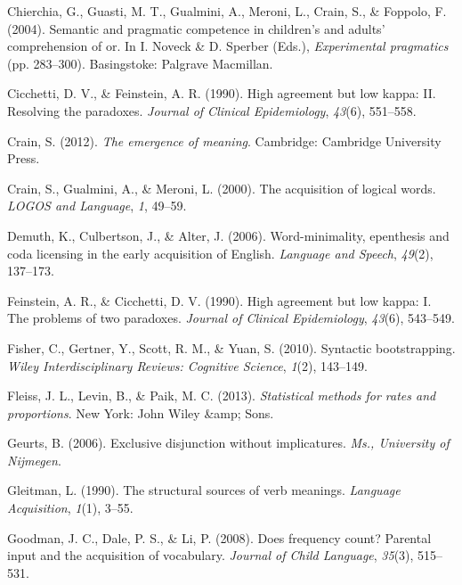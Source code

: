 \documentclass[,man,floatsintext]{apa6}
\begin{document}
\leavevmode\hypertarget{ref-chierchia2004semantic}{}%
Chierchia, G., Guasti, M. T., Gualmini, A., Meroni, L., Crain, S., \& Foppolo, F. (2004). Semantic and pragmatic competence in children's and adults' comprehension of or. In I. Noveck \& D. Sperber (Eds.), \emph{Experimental pragmatics} (pp. 283--300). Basingstoke: Palgrave Macmillan.

\leavevmode\hypertarget{ref-cicchetti1990high}{}%
Cicchetti, D. V., \& Feinstein, A. R. (1990). High agreement but low kappa: II. Resolving the paradoxes. \emph{Journal of Clinical Epidemiology}, \emph{43}(6), 551--558.

\leavevmode\hypertarget{ref-crain2012emergence}{}%
Crain, S. (2012). \emph{The emergence of meaning}. Cambridge: Cambridge University Press.

\leavevmode\hypertarget{ref-crain2000acquisition}{}%
Crain, S., Gualmini, A., \& Meroni, L. (2000). The acquisition of logical words. \emph{LOGOS and Language}, \emph{1}, 49--59.

\leavevmode\hypertarget{ref-demuth2006word}{}%
Demuth, K., Culbertson, J., \& Alter, J. (2006). Word-minimality, epenthesis and coda licensing in the early acquisition of English. \emph{Language and Speech}, \emph{49}(2), 137--173.

\leavevmode\hypertarget{ref-feinstein1990high}{}%
Feinstein, A. R., \& Cicchetti, D. V. (1990). High agreement but low kappa: I. The problems of two paradoxes. \emph{Journal of Clinical Epidemiology}, \emph{43}(6), 543--549.

\leavevmode\hypertarget{ref-fisher2010syntactic}{}%
Fisher, C., Gertner, Y., Scott, R. M., \& Yuan, S. (2010). Syntactic bootstrapping. \emph{Wiley Interdisciplinary Reviews: Cognitive Science}, \emph{1}(2), 143--149.

\leavevmode\hypertarget{ref-fleiss2013statistical}{}%
Fleiss, J. L., Levin, B., \& Paik, M. C. (2013). \emph{Statistical methods for rates and proportions}. New York: John Wiley \&amp; Sons.

\leavevmode\hypertarget{ref-geurts2006exclusive}{}%
Geurts, B. (2006). Exclusive disjunction without implicatures. \emph{Ms., University of Nijmegen}.

\leavevmode\hypertarget{ref-gleitman1990structural}{}%
Gleitman, L. (1990). The structural sources of verb meanings. \emph{Language Acquisition}, \emph{1}(1), 3--55.

\leavevmode\hypertarget{ref-goodman2008does}{}%
Goodman, J. C., Dale, P. S., \& Li, P. (2008). Does frequency count? Parental input and the acquisition of vocabulary. \emph{Journal of Child Language}, \emph{35}(3), 515--531.
\end{document}
